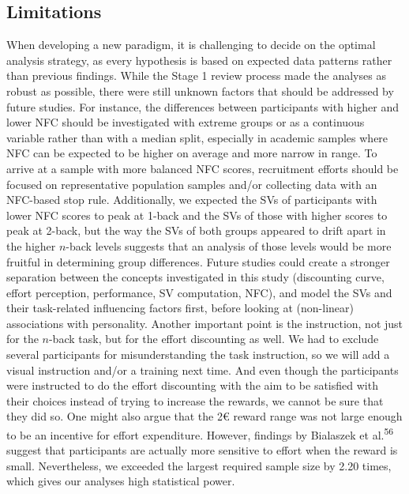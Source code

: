 \documentclass[
  man,floatsintext]{apa6}
\begin{document}
\hypertarget{limitations}{%
\subsection{Limitations}\label{limitations}}

When developing a new paradigm, it is challenging to decide on the optimal analysis strategy, as every hypothesis is based on expected data patterns rather than previous findings.
While the Stage 1 review process made the analyses as robust as possible, there were still unknown factors that should be addressed by future studies.
For instance, the differences between participants with higher and lower NFC should be investigated with extreme groups or as a continuous variable rather than with a median split, especially in academic samples where NFC can be expected to be higher on average and more narrow in range.
To arrive at a sample with more balanced NFC scores, recruitment efforts should be focused on representative population samples and/or collecting data with an NFC-based stop rule.
Additionally, we expected the SVs of participants with lower NFC scores to peak at 1-back and the SVs of those with higher scores to peak at 2-back, but the way the SVs of both groups appeared to drift apart in the higher \(n\)-back levels suggests that an analysis of those levels would be more fruitful in determining group differences.
Future studies could create a stronger separation between the concepts investigated in this study (discounting curve, effort perception, performance, SV computation, NFC), and model the SVs and their task-related influencing factors first, before looking at (non-linear) associations with personality.
Another important point is the instruction, not just for the \(n\)-back task, but for the effort discounting as well.
We had to exclude several participants for misunderstanding the task instruction, so we will add a visual instruction and/or a training next time.
And even though the participants were instructed to do the effort discounting with the aim to be satisfied with their choices instead of trying to increase the rewards, we cannot be sure that they did so.
One might also argue that the 2€ reward range was not large enough to be an incentive for effort expenditure.
However, findings by Bialaszek et al.\textsuperscript{56} suggest that participants are actually more sensitive to effort when the reward is small.
Nevertheless, we exceeded the largest required sample size by 2.20 times, which gives our analyses high statistical power.
\end{document}
